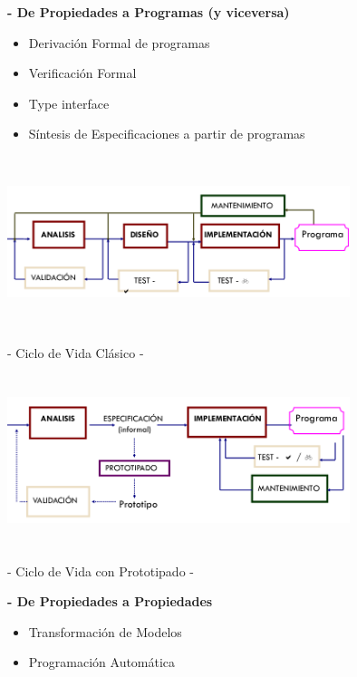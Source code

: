 \documentclass[12pt]{amsart}
\begin{document}
    \textbf{- De Propiedades a Programas (y viceversa)}

    \begin{itemize}
        \item \textrightarrow Derivación Formal de programas
        \item \textleftarrow Verificación Formal 
        \item \textleftarrow Type interface
        \item \textleftarrow Síntesis de Especificaciones a
        partir de programas
    \end{itemize}
    \begin{center}
        \includegraphics[width=10cm, height=5cm]{t2clasico.png}
        
        - Ciclo de Vida Clásico -

        \medskip

        \includegraphics[width=10cm, height=5cm]{t2prototipo.png}
        
        - Ciclo de Vida con Prototipado -
    \end{center}
    
    \textbf{- De Propiedades a Propiedades}

    \begin{itemize}
        \item \textrightarrow Transformación de Modelos
        \item \textrightarrow Programación Automática
    \end{itemize}
\end{document}
